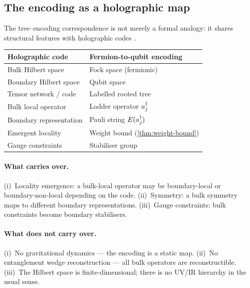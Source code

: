 %

\subsection{The encoding as a holographic map}
\label{sec:disc-holo}

The tree--encoding correspondence is not merely a formal analogy: it
shares structural features with holographic codes
\cite{pastawski2015happy,swingle2012}.

\begin{center}
\begin{tabular}{@{}ll@{}}
\toprule
\textbf{Holographic code} & \textbf{Fermion-to-qubit encoding} \\
\midrule
Bulk Hilbert space   & Fock space (fermionic) \\
Boundary Hilbert space & Qubit space \\
Tensor network / code  & Labelled rooted tree \\
Bulk local operator  & Ladder operator $a_{j}^{\dagger}$ \\
Boundary representation & Pauli string $E(a_{j}^{\dagger})$ \\
Emergent locality    & Weight bound (\cref{thm:weight-bound}) \\
Gauge constraints    & Stabiliser group \\
\bottomrule
\end{tabular}
\end{center}

\paragraph{What carries over.}
(i)~Locality emergence: a bulk-local operator may be boundary-local or
boundary-non-local depending on the code.
(ii)~Symmetry: a bulk symmetry maps to different boundary
representations.
(iii)~Gauge constraints: bulk constraints become boundary stabilisers.

\paragraph{What does not carry over.}
(i)~No gravitational dynamics — the encoding is a static map.
(ii)~No entanglement wedge reconstruction — all bulk operators are
reconstructible.
(iii)~The Hilbert space is finite-dimensional; there is no UV/IR
hierarchy in the usual sense.

